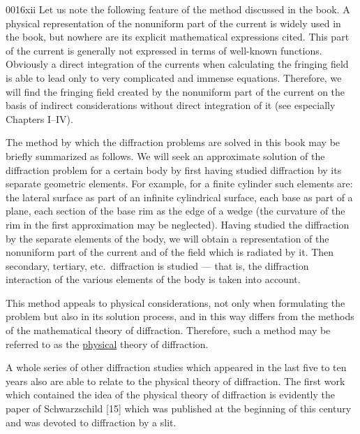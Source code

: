 \begin{scanpage}{0016}{xii}
Let us note the following feature of the method discussed in the book. A physical representation of the nonuniform part of the current is widely used in the book, but nowhere are its explicit mathematical expressions cited. This part of the current is generally not expressed in terms of well-known functions. Obviously a direct integration of the currents when calculating the fringing field is able to lead only to very complicated and immense equations. Therefore, we will find the fringing field created by the nonuniform part of the current on the basis of indirect considerations without direct integration of it (see especially Chapters I--IV).

The method by which the diffraction problems are solved in this book may be briefly summarized as follows. We will seek an approximate solution of the diffraction problem for a certain body by first having studied diffraction by its separate geometric elements. For example, for a finite cylinder such elements are: the lateral surface as part of an infinite cylindrical surface, each base as part of a plane, each section of the base rim as the edge of a wedge (the curvature of the rim in the first approximation may be neglected). Having studied the diffraction by the separate elements of the body, we will obtain a representation of the nonuniform part of the current and of the field which is radiated by it. Then secondary, tertiary, etc.\ diffraction is studied --- that is, the diffraction interaction of the various elements of the body is taken into account.

This method appeals to physical considerations, not only when formulating the problem but also in its solution process, and in this way differs from the methods of the mathematical theory of diffraction. Therefore, such a method may be referred to as the \uline{physical} theory of diffraction.

A whole series of other diffraction studies which appeared in the last five to ten years also are able to relate to the physical theory of diffraction. The first work which contained the idea of the physical theory of diffraction is evidently the paper of Schwarzschild [15] which was published at the beginning of this century and was devoted to diffraction by a slit.
\end{scanpage}
